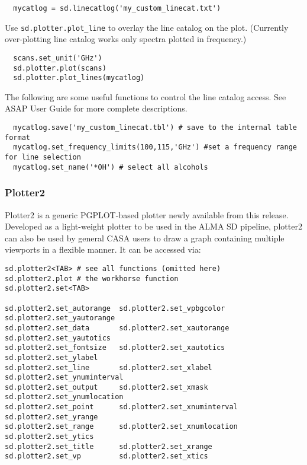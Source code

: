 \small
\begin{verbatim}
  mycatlog = sd.linecatlog('my_custom_linecat.txt')
\end{verbatim}
\normalsize

Use {\tt sd.plotter.plot\_line} to overlay the line catalog on 
the plot. (Currently over-plotting line catalog works only spectra plotted
in frequency.)

\small
\begin{verbatim}
  scans.set_unit('GHz')
  sd.plotter.plot(scans)
  sd.plotter.plot_lines(mycatlog)
\end{verbatim}
\normalsize

The following are some useful functions to control the line catalog
access. See ASAP User Guide for more complete descriptions.

\small
\begin{verbatim}
  mycatlog.save('my_custom_linecat.tbl') # save to the internal table format
  mycatlog.set_frequency_limits(100,115,'GHz') #set a frequency range for line selection
  mycatlog.set_name('*OH') # select all alcohols
\end{verbatim}
\normalsize

\subsubsection{Plotter2}
Plotter2 is a generic PGPLOT-based plotter newly available from this release. 
Developed as a light-weight plotter to be used in the ALMA SD pipeline, plotter2 can also be used by general CASA users to draw a graph containing multiple viewports in a flexible manner. It can be accessed via: 

\small
\begin{verbatim}
sd.plotter2<TAB> # see all functions (omitted here)
sd.plotter2.plot # the workhorse function
sd.plotter2.set<TAB>

sd.plotter2.set_autorange  sd.plotter2.set_vpbgcolor     sd.plotter2.set_yautorange
sd.plotter2.set_data       sd.plotter2.set_xautorange    sd.plotter2.set_yautotics
sd.plotter2.set_fontsize   sd.plotter2.set_xautotics     sd.plotter2.set_ylabel
sd.plotter2.set_line       sd.plotter2.set_xlabel        sd.plotter2.set_ynuminterval
sd.plotter2.set_output     sd.plotter2.set_xmask         sd.plotter2.set_ynumlocation
sd.plotter2.set_point      sd.plotter2.set_xnuminterval  sd.plotter2.set_yrange
sd.plotter2.set_range      sd.plotter2.set_xnumlocation  sd.plotter2.set_ytics
sd.plotter2.set_title      sd.plotter2.set_xrange
sd.plotter2.set_vp         sd.plotter2.set_xtics
\end{verbatim}
\normalsize

